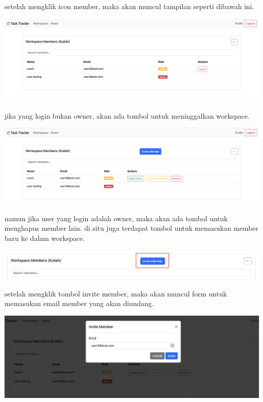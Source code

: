 setelah mengklik icon member, maka akan muncul tampilan seperti dibawah ini.
\begin{center}
  \includegraphics[width=1\textwidth]{assets/ui/list_member.png}
\end{center}
jika yang login bukan owner, akan ada tombol untuk meninggalkan workspace.
\begin{center}
  \includegraphics[width=1\textwidth]{assets/ui/list_member_owner.png}
\end{center}
namun jika user yang login adalah owner, maka akan ada tombol untuk menghapus member lain.
di situ juga terdapat tombol untuk memasukan member baru ke dalam workspace.
\begin{center}
  \includegraphics[width=1\textwidth]{assets/ui/invite_member_button_location.png}
\end{center}
setelah mengklik tombol invite member, maka akan muncul form untuk memasukan email member yang akan diundang.
\begin{center}
  \includegraphics[width=1\textwidth]{assets/ui/invite_member_form_filled.png}
\end{center}
